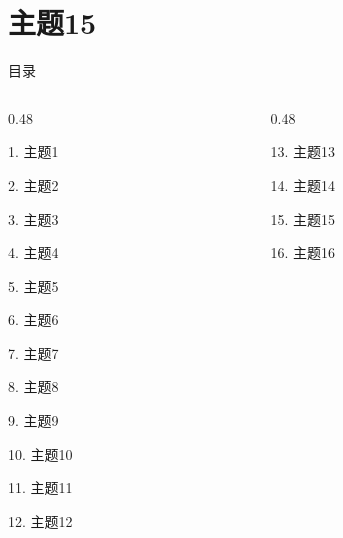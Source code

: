 \documentclass[aspectratio=169,10pt,fontset=fandol]{ctexbeamer}
\begin{document}
\section{主题15}
\begin{frame}[t,fragile]{目录}
\small
\begin{columns}[T,onlytextwidth]
\begin{column}{0.48\textwidth}
{\color{black}\small 1. 主题1\par}\vspace{0.22em}
{\color{black}\small 2. 主题2\par}\vspace{0.22em}
{\color{black}\small 3. 主题3\par}\vspace{0.22em}
{\color{black}\small 4. 主题4\par}\vspace{0.22em}
{\color{black}\small 5. 主题5\par}\vspace{0.22em}
{\color{black}\small 6. 主题6\par}\vspace{0.22em}
{\color{black}\small 7. 主题7\par}\vspace{0.22em}
{\color{black}\small 8. 主题8\par}\vspace{0.22em}
{\color{black}\small 9. 主题9\par}\vspace{0.22em}
{\color{black}\small 10. 主题10\par}\vspace{0.22em}
{\color{black}\small 11. 主题11\par}\vspace{0.22em}
{\color{black}\small 12. 主题12\par}\vspace{0.22em}
\end{column}
\begin{column}{0.48\textwidth}
{\color{black}\small 13. 主题13\par}\vspace{0.22em}
{\color{black}\small 14. 主题14\par}\vspace{0.22em}
{\color{blue}\small 15. 主题15\par}\vspace{0.22em}
{\color{gray!40}\small 16. 主题16\par}\vspace{0.22em}

\end{column}
\end{columns}
\end{frame}
\end{document}
